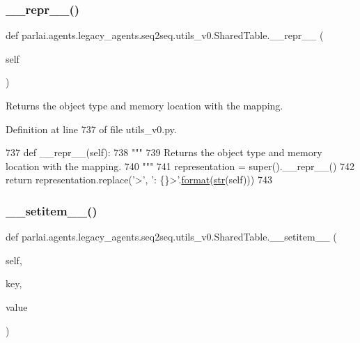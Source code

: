 \subsubsection{\texorpdfstring{\+\_\+\+\_\+repr\+\_\+\+\_\+()}{\_\_repr\_\_()}}
{\footnotesize\ttfamily def parlai.\+agents.\+legacy\+\_\+agents.\+seq2seq.\+utils\+\_\+v0.\+Shared\+Table.\+\_\+\+\_\+repr\+\_\+\+\_\+ (\begin{DoxyParamCaption}\item[{}]{self }\end{DoxyParamCaption})}

\begin{DoxyVerb}Returns the object type and memory location with the mapping.
\end{DoxyVerb}
 

Definition at line 737 of file utils\+\_\+v0.\+py.


\begin{DoxyCode}
737     \textcolor{keyword}{def }\_\_repr\_\_(self):
738         \textcolor{stringliteral}{"""}
739 \textcolor{stringliteral}{        Returns the object type and memory location with the mapping.}
740 \textcolor{stringliteral}{        """}
741         representation = super().\_\_repr\_\_()
742         \textcolor{keywordflow}{return} representation.replace(\textcolor{stringliteral}{'>'}, \textcolor{stringliteral}{': \{\}>'}.\hyperlink{namespaceparlai_1_1chat__service_1_1services_1_1messenger_1_1shared__utils_a32e2e2022b824fbaf80c747160b52a76}{format}(\hyperlink{namespacegenerate__task__READMEs_a5b88452ffb87b78c8c85ececebafc09f}{str}(self)))
743 
\end{DoxyCode}
\mbox{\label{classparlai_1_1agents_1_1legacy__agents_1_1seq2seq_1_1utils__v0_1_1SharedTable_a03c479f82d23393bb64f53fd2ba70b6d}} 
\subsubsection{\texorpdfstring{\+\_\+\+\_\+setitem\+\_\+\+\_\+()}{\_\_setitem\_\_()}}
{\footnotesize\ttfamily def parlai.\+agents.\+legacy\+\_\+agents.\+seq2seq.\+utils\+\_\+v0.\+Shared\+Table.\+\_\+\+\_\+setitem\+\_\+\+\_\+ (\begin{DoxyParamCaption}\item[{}]{self,  }\item[{}]{key,  }\item[{}]{value }\end{DoxyParamCaption})}

